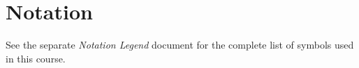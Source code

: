 \documentclass[letterpaper,10pt]{article}
\begin{document}
\vspace{1em}


\section*{Notation}

See the separate \textit{Notation Legend} document for the complete list of symbols used in this course.
\end{document}
